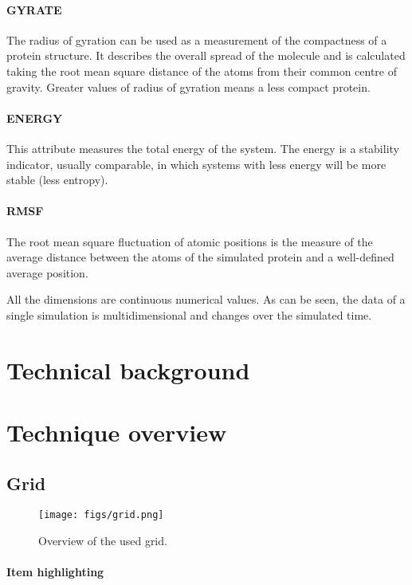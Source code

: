 \documentclass[10pt, conference]{IEEEtran}
\begin{document}
\paragraph*{GYRATE} The radius of gyration can be used as a measurement of the compactness of a protein structure. It describes the overall spread of the molecule and is calculated taking the root mean square distance of the atoms from their common centre of gravity. Greater values of radius of gyration means a less compact protein.
%

\paragraph*{ENERGY} This attribute measures the total energy of the system. The energy is a stability indicator, usually comparable, in which systems with less energy will be more stable (less entropy).
%

\paragraph*{RMSF} The root mean square fluctuation of atomic positions is the measure of the average distance between the atoms of the simulated protein and a well-defined average position. 
%

All the dimensions are continuous numerical values. As can be seen, the data of a single simulation is multidimensional and changes over the simulated time.

\section{Technical background}
%

\section{Technique overview}
%

\subsection{Grid}
\begin{figure}
\texttt{[image: figs/grid.png]}
\caption{Overview of the used grid.} 
\label{fig:grid}
\end{figure}
\paragraph*{Item highlighting}
\end{document}
